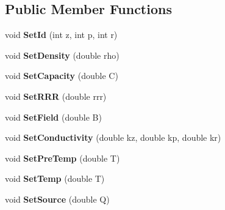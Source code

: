 \subsection*{Public Member Functions}
\begin{DoxyCompactItemize}
\item 
\hypertarget{class_i_thermal_container_a30121d91424bdff3d4ae0bb0d7fae929}{}void {\bfseries Set\+Id} (int z, int p, int r)\label{class_i_thermal_container_a30121d91424bdff3d4ae0bb0d7fae929}

\item 
\hypertarget{class_i_thermal_container_a30ba79362855965ed9e4c76543caa818}{}void {\bfseries Set\+Density} (double rho)\label{class_i_thermal_container_a30ba79362855965ed9e4c76543caa818}

\item 
\hypertarget{class_i_thermal_container_a203ceb30ee65e9695769753f8626e482}{}void {\bfseries Set\+Capacity} (double C)\label{class_i_thermal_container_a203ceb30ee65e9695769753f8626e482}

\item 
\hypertarget{class_i_thermal_container_ae53849cade71a22c093b0bca9601dc44}{}void {\bfseries Set\+R\+R\+R} (double rrr)\label{class_i_thermal_container_ae53849cade71a22c093b0bca9601dc44}

\item 
\hypertarget{class_i_thermal_container_a39a2ec28b4469e7e340ea20389ee3f8a}{}void {\bfseries Set\+Field} (double B)\label{class_i_thermal_container_a39a2ec28b4469e7e340ea20389ee3f8a}

\item 
\hypertarget{class_i_thermal_container_ad4c02b16a29be07586ac55c6d33a9f43}{}void {\bfseries Set\+Conductivity} (double kz, double kp, double kr)\label{class_i_thermal_container_ad4c02b16a29be07586ac55c6d33a9f43}

\item 
\hypertarget{class_i_thermal_container_a9edbdc615900f9c482fe00cd339e8fcb}{}void {\bfseries Set\+Pre\+Temp} (double T)\label{class_i_thermal_container_a9edbdc615900f9c482fe00cd339e8fcb}

\item 
\hypertarget{class_i_thermal_container_ad2820e18e36901ac7e51dcefc8efc990}{}void {\bfseries Set\+Temp} (double T)\label{class_i_thermal_container_ad2820e18e36901ac7e51dcefc8efc990}

\item 
\hypertarget{class_i_thermal_container_af2665686e39e6d80a1baf2742a68786c}{}void {\bfseries Set\+Source} (double Q)\label{class_i_thermal_container_af2665686e39e6d80a1baf2742a68786c}


\end{DoxyCompactItemize}

